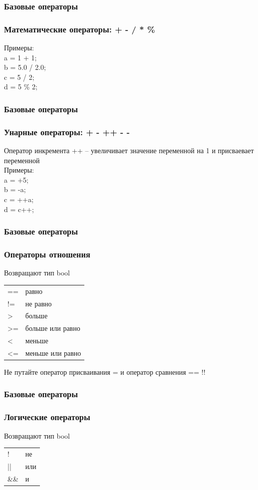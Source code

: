 \documentclass[12pt,pdf,hyperref={unicode}]{beamer}
\begin{document}
\begin{frame}
\frametitle{Базовые операторы}
\frametitle{Математические операторы: + - / * \%} 
Примеры:\\
\quad a = 1 + 1; \\
\quad b = 5.0 / 2.0;\\
\quad c = 5 / 2;\\
\quad d = 5 \% 2;\\
\end{frame}

\begin{frame}
\frametitle{Базовые операторы}
\frametitle{Унарные операторы: + - ++ - -}
Оператор инкремента ++ -- увеличивает значение переменной на 1 и присваевает переменной  \\
Примеры:\\
\quad a = +5; \\
\quad b = -a;\\
\quad c = ++a;\\
\quad d = c++;\\
\end{frame}







\iffalse

\begin{frame}
\frametitle{Базовые операторы}
\frametitle{Операторы отношения}
Возвращают тип bool
\begin{center}
\begin{tabular}{ l l}
  == & равно \\
  != & не равно \\
  > & больше \\
  >= & больше или равно \\
  < & меньше \\
  <= & меньше или равно \\
\end{tabular}
\end{center}

Не путайте оператор присваивания = и оператор сравнения == !! 
\end{frame}


\begin{frame}
\frametitle{Базовые операторы}
\frametitle{Логические операторы}
Возвращают тип bool
\begin{center}
\begin{tabular}{ l l}
  ! & не \\
  || & или \\
  \&\& & и \\
\end{tabular}
\end{center}
\end{frame}
\end{document}
